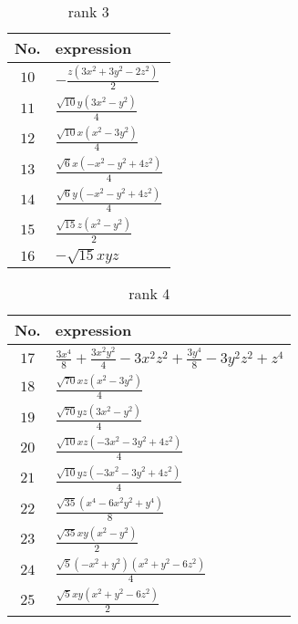 \documentclass[fleqn,8pt,landscape]{jsarticle}
\begin{document}
\begin{table}[ht!]
\begin{center}
\caption{rank 3}
\renewcommand{\arraystretch}{1.3}
\begin{tabular}{cl} \hline \hline
No. & expression \\ \hline
$ 10 $ & $ - \frac{z \left(3 x^{2} + 3 y^{2} - 2 z^{2}\right)}{2} $ \\
$ 11 $ & $ \frac{\sqrt{10} y \left(3 x^{2} - y^{2}\right)}{4} $ \\
$ 12 $ & $ \frac{\sqrt{10} x \left(x^{2} - 3 y^{2}\right)}{4} $ \\
$ 13 $ & $ \frac{\sqrt{6} x \left(- x^{2} - y^{2} + 4 z^{2}\right)}{4} $ \\
$ 14 $ & $ \frac{\sqrt{6} y \left(- x^{2} - y^{2} + 4 z^{2}\right)}{4} $ \\
$ 15 $ & $ \frac{\sqrt{15} z \left(x^{2} - y^{2}\right)}{2} $ \\
$ 16 $ & $ - \sqrt{15} x y z $ \\
 \hline \hline
\end{tabular}
\end{center}
\end{table}
\begin{table}[ht!]
\begin{center}
\caption{rank 4}
\renewcommand{\arraystretch}{1.3}
\begin{tabular}{cl} \hline \hline
No. & expression \\ \hline
$ 17 $ & $ \frac{3 x^{4}}{8} + \frac{3 x^{2} y^{2}}{4} - 3 x^{2} z^{2} + \frac{3 y^{4}}{8} - 3 y^{2} z^{2} + z^{4} $ \\
$ 18 $ & $ \frac{\sqrt{70} x z \left(x^{2} - 3 y^{2}\right)}{4} $ \\
$ 19 $ & $ \frac{\sqrt{70} y z \left(3 x^{2} - y^{2}\right)}{4} $ \\
$ 20 $ & $ \frac{\sqrt{10} x z \left(- 3 x^{2} - 3 y^{2} + 4 z^{2}\right)}{4} $ \\
$ 21 $ & $ \frac{\sqrt{10} y z \left(- 3 x^{2} - 3 y^{2} + 4 z^{2}\right)}{4} $ \\
$ 22 $ & $ \frac{\sqrt{35} \left(x^{4} - 6 x^{2} y^{2} + y^{4}\right)}{8} $ \\
$ 23 $ & $ \frac{\sqrt{35} x y \left(x^{2} - y^{2}\right)}{2} $ \\
$ 24 $ & $ \frac{\sqrt{5} \left(- x^{2} + y^{2}\right) \left(x^{2} + y^{2} - 6 z^{2}\right)}{4} $ \\
$ 25 $ & $ \frac{\sqrt{5} x y \left(x^{2} + y^{2} - 6 z^{2}\right)}{2} $ \\
 \hline \hline
\end{tabular}
\end{center}
\end{table}
\end{document}
